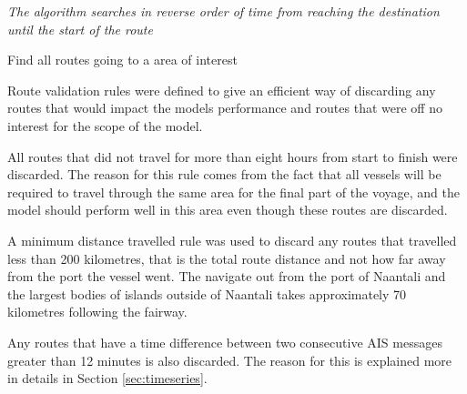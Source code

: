\documentclass[../main.tex]{subfiles}
\begin{document}
\begin{algorithm}[H]
\SetAlgoNoLine
\SetAlgoNoEnd

\emph{The algorithm searches in reverse order of time from reaching the destination until the start of the route}\;
\BlankLine
{}
\caption{Find all routes going to a area of interest}
\label{alg:search}
\end{algorithm}
\vspace*{5mm}

Route validation rules were defined to give an efficient way of discarding any routes that would impact the models performance and routes that were off no interest for the scope of the model.

All routes that did not travel for more than eight hours from start to finish were discarded. The reason for this rule comes from the fact that all vessels will be required to travel through the same area for the final part of the voyage, and the model should perform well in this area even though these routes are discarded.

A minimum distance travelled rule was used to discard any routes that travelled less than 200 kilometres, that is the total route distance and not how far away from the port the vessel went. The navigate out from the port of Naantali and the largest bodies of islands outside of Naantali takes approximately 70 kilometres following the fairway.

Any routes that have a time difference between two consecutive AIS messages greater than 12 minutes is also discarded. The reason for this is explained more in details in Section \ref{sec:timeseries}.
\end{document}
